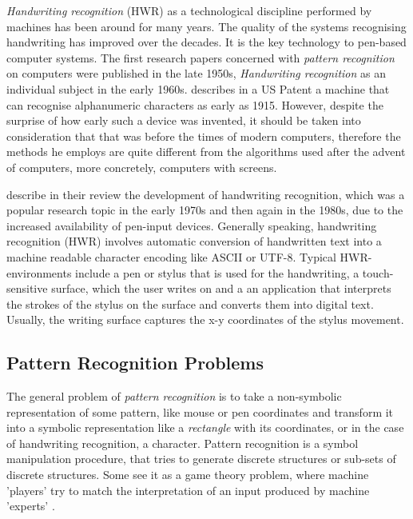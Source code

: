\emph{Handwriting recognition} (HWR) as a technological discipline performed 
by machines has been around for many years. The quality of the systems 
recognising handwriting has improved over the decades. It is the key 
technology to pen-based computer systems. The first research papers 
concerned with \emph{pattern recognition} on computers were published 
in the late 1950s, \emph{Handwriting recognition} as an individual subject in 
the early 1960s.  describes in a US Patent
a machine that can recognise alphanumeric characters as early as 1915. 
However, despite the surprise of how early such a device was invented,
it should be taken into consideration that that was before the times 
of modern computers, therefore the methods he employs are quite different 
from the algorithms used after the advent of computers, more concretely, 
computers with screens. 

 describe in their review the development of 
handwriting recognition, which was a popular research topic in the early 
1970s and then again in the 1980s, due to the increased availability 
of pen-input devices.  Generally speaking, handwriting recognition (HWR) 
involves automatic conversion of handwritten text into a machine readable 
character encoding like ASCII or UTF-8. Typical HWR-environments include 
a pen or stylus that is used for the handwriting, a touch-sensitive surface, 
which the user writes on and a an application that interprets the strokes 
of the stylus on the surface and converts them into digital text. 
Usually, the writing surface captures the x-y coordinates of the stylus 
movement.

\subsection{Pattern Recognition Problems}
\label{sec:patternrecognitionproblems}


The general problem of \emph{pattern recognition} is to take a non-symbolic 
representation of some pattern, like mouse or pen coordinates and transform
it into a symbolic representation like a \emph{rectangle} with its coordinates,
or in the case of handwriting recognition, a character. Pattern recognition is 
a symbol manipulation procedure, that tries to generate discrete structures or sub-sets of discrete structures. Some see it as a game theory problem, 
where machine 'players' try to match the interpretation of an input produced 
by machine 'experts' .

